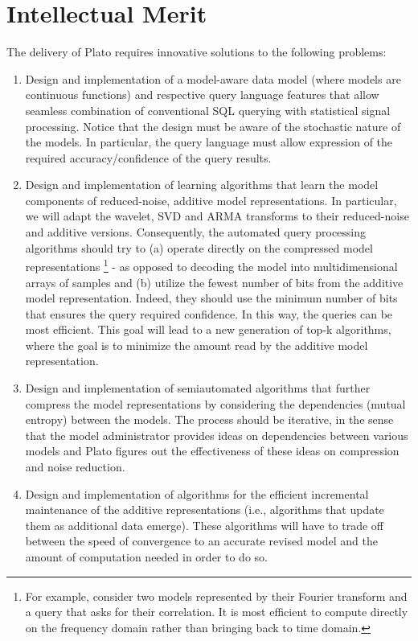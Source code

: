 \section{Intellectual Merit}
\label{sec:merit}
The delivery of Plato requires innovative solutions to the following problems:
%
\begin{enumerate}
%
\item Design and implementation of a model-aware data model (where models are continuous functions) and respective query language features that allow seamless combination of conventional SQL querying with statistical signal processing. Notice that the design must be aware of the stochastic nature of the models. In particular, the query language must allow expression of the required accuracy/confidence of the query results.
%
\item Design and implementation of learning algorithms that learn the model components of reduced-noise, additive model representations. In particular, we will adapt the wavelet, SVD and ARMA transforms to their reduced-noise and additive versions. Consequently, the automated query processing algorithms should try to (a) operate directly on the compressed model representations%
\footnote{
For example, consider two models represented by their Fourier transform and a query that asks for their correlation. It is most efficient to compute directly on the frequency domain rather than bringing back to time domain.
} - as opposed to decoding the model into multidimensional arrays of samples and (b) utilize the fewest number of bits from the additive model representation. Indeed, they should use the minimum number of bits that ensures the query required confidence. In this way, the queries can be most efficient. This goal will lead to a new generation of top-k algorithms, where the goal is to minimize the amount read by the additive model representation.
%
\item Design and implementation of semiautomated algorithms that further compress the model representations by considering the dependencies (mutual entropy) between the models. The process should be iterative, in the sense that the model administrator provides ideas on dependencies between various models and Plato figures out the effectiveness of these ideas on compression and noise reduction.
%
\item Design and implementation of algorithms for the efficient incremental maintenance of the additive representations (i.e., algorithms that update them as additional data emerge). These algorithms will have to trade off between the speed of convergence to an accurate revised model and the amount of computation needed in order to do so.

\end{enumerate}
